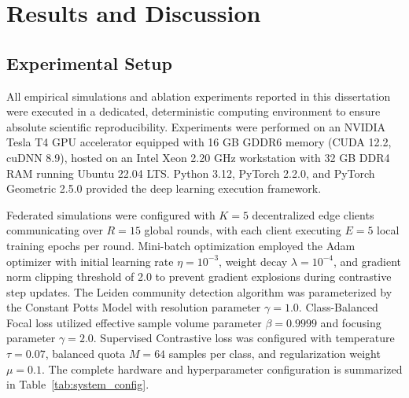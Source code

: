 \documentclass[12pt,a4paper]{report}
\begin{document}
\chapter{Results and Discussion}\label{ch:results}
\label{chap:results}

\section{Experimental Setup}\label{sec:setup}
\label{sec:exp_setup}

All empirical simulations and ablation experiments reported in this dissertation were executed in a dedicated, deterministic computing environment to ensure absolute scientific reproducibility. Experiments were performed on an NVIDIA Tesla T4 GPU accelerator equipped with 16 GB GDDR6 memory (CUDA 12.2, cuDNN 8.9), hosted on an Intel Xeon 2.20 GHz workstation with 32 GB DDR4 RAM running Ubuntu 22.04 LTS. Python 3.12, PyTorch 2.2.0, and PyTorch Geometric 2.5.0 provided the deep learning execution framework.

Federated simulations were configured with $K = 5$ decentralized edge clients communicating over $R = 15$ global rounds, with each client executing $E = 5$ local training epochs per round. Mini-batch optimization employed the Adam optimizer with initial learning rate $\eta = 10^{-3}$, weight decay $\lambda = 10^{-4}$, and gradient norm clipping threshold of 2.0 to prevent gradient explosions during contrastive step updates. The Leiden community detection algorithm was parameterized by the Constant Potts Model with resolution parameter $\gamma = 1.0$. Class-Balanced Focal loss utilized effective sample volume parameter $\beta = 0.9999$ and focusing parameter $\gamma = 2.0$. Supervised Contrastive loss was configured with temperature $\tau = 0.07$, balanced quota $M = 64$ samples per class, and regularization weight $\mu = 0.1$. The complete hardware and hyperparameter configuration is summarized in Table~\ref{tab:system_config}.
\end{document}
